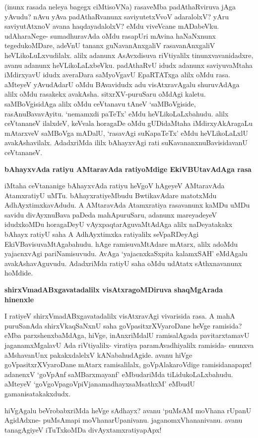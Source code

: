 (inunx rasada neleya bagegx ciMtisoVNa) rasaveMba padAthaRviruva jAga yAvudu? nAvu yAva padAthaRvanunx saviyutetxVvoV adaralolxV? yAru saviyutAtxnoV avana haqdayadalolxV? eMdu viveVcane mADabeVku. udAharaNege- sumadhuravAda oMdu rasapUri mAvina haNaNxnunx tegedukoMDare, adeVnU tananx guNavanAnxgaliV rasavanAnxgaliV heVLikoLuLxvudilalx. alilx adanunx AsAvxdisuva riVtiyalilx tinunxvavanidadxre, avanu adanunx heVLikoLaLxbeVku. padAthaRvU idudx adanunx saviyuvaMtaha iMdirxyavU idudx averaDara saMyoVgavU EpaRTATxga alilx oMdu rasa. aMteyeV yAvudAdarU oMdu BAvavidudx adu visAtxravAgalu shuruvAdAga alilx oMdu rasakekx avakAsha. sitxrXV-puruSaru oMdAgi kaletu. saMBoVgisidAga alilx oMdu ceVtanavu tAneV `saMBoVgiside, rasAnuBavavAyitu. `nemamxdi paTeTx' eMdu heVLikoLaLxbahudu. alilx ceVtananeV ilalxdeV, keVvala horagaDe oMdu gUDidaMtaha iMdirxyAkAragaLu mAtarxveV saMBoVga mADalU, `rasavAgi suKapaTeTx' eMdu heVLikoLaLxlU avakAshavilalx. AdadxriMda ililx bAhayxvAgi rati suKavananxnuBavisidavanU ceVtananeV.

\noindent
{\bf\large{bAhayxvAda ratiyu AMtaravAda ratiyoMdige EkiVBUtavAdAga rasa}}\label{page228}

iMtaha ceVtananige bAhayxvAda ratiyu heVgoV hAgeyeV AMtaravAda AtamxratiyU uMTu. bAhayxratiyeMbudu BwtikavAdare matotxMdu AdhAyxtimxkavAdudu. A AMtaravAda Atamxratiya rasavanunx kaMDu uMDu savidu divAyxnuBava paDeda mahApuruSaru, adanunx mareyadeyeV idudxkoMDu horagaDeyU vAyxpaqtarAguvaMtAdAga alilx naDeyatakakx bAhayx ratiyU saha A AdhAyxtimxka ratiyalilx seVpaRDeyAgi EkiVBavisuvaMtAgabahudu. hAge ramisuvaMtAdare mAtarx, alilx adoMdu yajacnxvAgi pariNamisuvudu. AvAga `yajacnxkaSxpita kalamxSAH'\label{228} eMdAgalu avakAshavAguvudu. AdadxriMda ratiyU saha oMdu udAtatx sAthxnavanunx hoMdide.

\noindent
{\bf\large{shirxVmadABxgavatadalilx visAtxragoMDiruva shaqMgArada hinenxle}}

I ratiyeV shirxVmadABxgavatadalilx visAtxravAgi vivarisida rasa. A mahA puruSanAda shirxVkaqSaNxnU saha goVpasitxrXVyaroDane heVge ramisida? eMba parxshenxbaMdAga, hiVge, inAnxriMdalU ramisalAgada pavitarxtamavU jaganamxMgalavU Ada riVtiyalilx- viratiya paramAvadhiyalilx ramisida- enunxva aMshavanUnx pakakxdalelxV kANabahudAgide. avanu hiVge goVpasitxrXVyaroDane mAtarx ramisalilalx, goVpAlakaroVdige ramisidanapapx! adanenxV `goVpAnf saMBarxmayanf'\label{229} eMbudariMda tiLidukoLaLxbahudu. aMteyeV `goVgoVpagoVpiVjanamadhayxsaMsathxM'\label{229} eMbudU gamanisatakakxdudx.

hiVgAgalu beVrobabxriMda heVge sAdhayx? avanu `puMsAM moVhana rUpanU AgidAdxne- puMsAmapi moVhanarUpanivanu. jaganomxVhananivanu. avanu tanagAgiyeV iTuTxkoMDa divAyxtamxratiyapApx!


